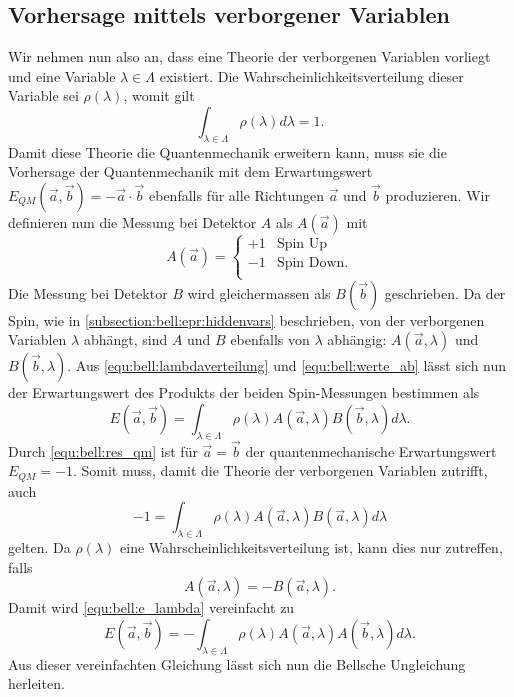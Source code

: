 \begin{refsection}
\subsection{Vorhersage mittels verborgener Variablen}
Wir nehmen nun also an, dass eine Theorie der verborgenen Variablen vorliegt
und eine Variable $\lambda \in \Lambda$ existiert.
Die Wahrscheinlichkeitsverteilung dieser Variable sei $\rho(\lambda)$, womit gilt
\begin{equation}\label{equ:bell:lambdaverteilung}
    \int_{\lambda\in\Lambda} \rho(\lambda) d\lambda = 1.
\end{equation}
Damit diese Theorie die Quantenmechanik erweitern kann, muss sie die Vorhersage
der Quantenmechanik mit dem Erwartungswert 
$E_{QM}(\vec{a},\vec{b}) = -\vec{a}\cdot\vec{b}$
ebenfalls f\"ur alle Richtungen $\vec{a}$ und $\vec{b}$ produzieren.
Wir definieren nun die Messung bei Detektor $A$ als $A(\vec{a})$ mit
\begin{equation}\label{equ:bell:werte_ab}
    A(\vec{a}) = \begin{cases}
        +1 & \text{Spin Up} \\
        -1 & \text{Spin Down.} \\
    \end{cases}
\end{equation}
Die Messung bei Detektor $B$ wird gleichermassen als $B(\vec{b})$ geschrieben.
Da der Spin, wie in \ref{subsection:bell:epr:hiddenvars} beschrieben, von der
verborgenen Variablen $\lambda$ abh\"angt, sind $A$ und $B$ ebenfalls von
$\lambda$ abh\"angig: $A(\vec{a},\lambda)$ und $B(\vec{b},\lambda)$.
Aus \eqref{equ:bell:lambdaverteilung} und \eqref{equ:bell:werte_ab}
l\"asst sich nun der Erwartungswert des Produkts der beiden Spin-Messungen
bestimmen als
\begin{equation}\label{equ:bell:e_lambda}
    E(\vec{a},\vec{b}) = \int_{\lambda\in\Lambda} 
        \rho(\lambda) A(\vec{a},\lambda) B(\vec{b},\lambda) d\lambda.
\end{equation}
Durch \eqref{equ:bell:res_qm} ist f\"ur $\vec{a} = \vec{b}$ der 
quantenmechanische Erwartungswert $E_{QM} = -1$.
Somit muss, damit die Theorie der verborgenen Variablen zutrifft, auch
\[
    -1 = \int_{\lambda\in\Lambda} 
        \rho(\lambda) A(\vec{a},\lambda) B(\vec{a},\lambda) d\lambda
\]
gelten.
Da $\rho(\lambda)$ eine Wahrscheinlichkeitsverteilung ist, kann dies nur
zutreffen, falls
\begin{equation}\label{equ:bell:antikorrelation}
    A(\vec{a},\lambda) = -B(\vec{a},\lambda).
\end{equation}
Damit wird \eqref{equ:bell:e_lambda} vereinfacht zu
\begin{equation}\label{equ:bell:e_lambda_vereinf}
    E(\vec{a},\vec{b}) = -\int_{\lambda\in\Lambda} 
        \rho(\lambda) A(\vec{a},\lambda) A(\vec{b},\lambda) d\lambda.
\end{equation}
Aus dieser vereinfachten Gleichung l\"asst sich nun die Bellsche Ungleichung
herleiten.


\end{refsection}
